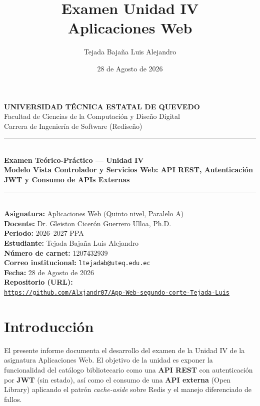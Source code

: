\documentclass[11pt,a4paper]{article}
\title{Examen Unidad IV\\
  Aplicaciones Web}
\author{Tejada Bajaña Luis Alejandro}
\date{28 de Agosto de 2026}
\begin{document}
\begin{titlepage}
  \centering

  {\Large \textbf{UNIVERSIDAD TÉCNICA ESTATAL DE QUEVEDO}}\\[0.4cm]
  {\large Facultad de Ciencias de la Computación y Diseño Digital}\\[0.2cm]
  {\large Carrera de Ingeniería de Software (Rediseño)}\\[1.2cm]

  \rule{\textwidth}{0.5pt}\\[0.6cm]
  {\LARGE \textbf{Examen Teórico-Práctico --- Unidad IV}}\\[0.3cm]
  {\Large \textbf{Modelo Vista Controlador y Servicios Web:\newline
  API REST, Autenticación JWT y Consumo de APIs Externas}}\\[0.6cm]
  \rule{\textwidth}{0.5pt}\\[1.2cm]

  {\large \textbf{Asignatura:} Aplicaciones Web (Quinto nivel, Paralelo A)}\\[0.4cm]
  {\large \textbf{Docente:} Dr. Gleiston Cicerón Guerrero Ulloa, Ph.D.}\\[0.4cm]
  {\large \textbf{Periodo:} 2026--2027 PPA}\\[1.2cm]

  {\Large \textbf{Estudiante:} Tejada Bajaña Luis Alejandro}\\[0.4cm]
  {\large \textbf{Número de carnet:} 1207432939}\\[0.4cm]
  {\large \textbf{Correo institucional:} \texttt{ltejadab@uteq.edu.ec}}\\[0.4cm]
  {\large \textbf{Fecha:} 28 de Agosto de 2026}\\[1.2cm]

  \textbf{Repositorio (URL):}\\[0.2cm]
  {\large \texttt{\url{https://github.com/Alxjandr07/App-Web-segundo-corte-Tejada-Luis}}}\\[1cm]

  \vfill
\end{titlepage}

\section{Introducción}
El presente informe documenta el desarrollo del examen de la Unidad IV de la
asignatura Aplicaciones Web. El objetivo de la unidad es exponer la funcionalidad
del catálogo bibliotecario como una \textbf{API REST} con autenticación por
\textbf{JWT} (sin estado), así como el consumo de una \textbf{API externa}
(Open Library) aplicando el patrón \emph{cache-aside} sobre Redis y el manejo
diferenciado de fallos.
\end{document}
